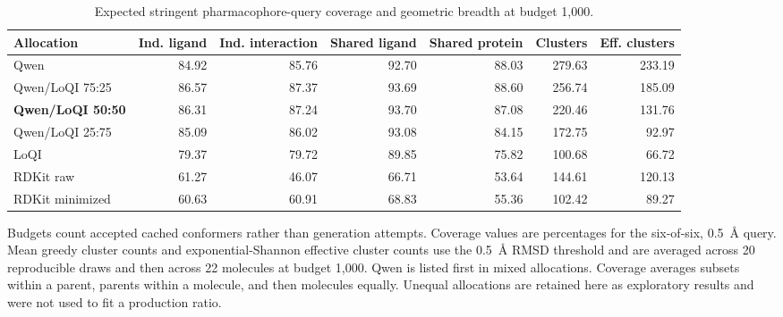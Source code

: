 \begin{table}[htbp]
\centering\footnotesize
\setlength{\tabcolsep}{3.5pt}
\caption{Expected stringent pharmacophore-query coverage and geometric breadth at budget 1,000.}
\label{tab:cdpkit-endpoint-coverage}
\begin{tabular}{lrrrrrr}
\toprule
\textbf{Allocation} & \textbf{Ind. ligand} & \textbf{Ind. interaction} & \textbf{Shared ligand} & \textbf{Shared protein} & \textbf{Clusters} & \textbf{Eff. clusters} \\
\midrule
\rowcolor{tableShade}
Qwen & 84.92 & 85.76 & 92.70 & 88.03 & 279.63 & 233.19 \\
Qwen/LoQI 75:25 & 86.57 & 87.37 & 93.69 & 88.60 & 256.74 & 185.09 \\
\rowcolor{tableShade}
\textbf{Qwen/LoQI 50:50} & 86.31 & 87.24 & 93.70 & 87.08 & 220.46 & 131.76 \\
Qwen/LoQI 25:75 & 85.09 & 86.02 & 93.08 & 84.15 & 172.75 & 92.97 \\
\rowcolor{tableShade}
LoQI & 79.37 & 79.72 & 89.85 & 75.82 & 100.68 & 66.72 \\
RDKit raw & 61.27 & 46.07 & 66.71 & 53.64 & 144.61 & 120.13 \\
\rowcolor{tableShade}
RDKit minimized & 60.63 & 60.91 & 68.83 & 55.36 & 102.42 & 89.27 \\
\bottomrule
\end{tabular}
\par\smallskip
\begin{minipage}{0.95\linewidth}\footnotesize
Budgets count accepted cached conformers rather than generation attempts. Coverage values are percentages for the six-of-six, 0.5~\AA{} query. Mean greedy cluster counts and exponential-Shannon effective cluster counts use the 0.5~\AA{} RMSD threshold and are averaged across 20 reproducible draws and then across 22 molecules at budget 1,000. Qwen is listed first in mixed allocations. Coverage averages subsets within a parent, parents within a molecule, and then molecules equally. Unequal allocations are retained here as exploratory results and were not used to fit a production ratio.
\end{minipage}
\end{table}
